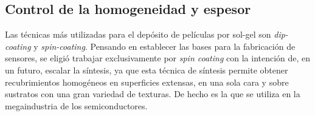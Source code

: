 	\subsection{Control de la homogeneidad y espesor}
		
		Las técnicas más utilizadas para el depósito de películas por sol-gel son \textit{dip-coating} y \textit{spin-coating}. 
		Pensando en establecer las bases para la fabricación de sensores, se eligió trabajar exclusivamente por \textit{spin coating} con la intención de, en un futuro, escalar la síntesis, ya que esta técnica de síntesis permite obtener recubrimientos homogéneos en superficies extensas, en una sola cara y sobre sustratos con una gran variedad de texturas. De hecho es la que se utiliza en la megaindustria de los semiconductores.\cite{Franssila2004,Jaeger2001} 

		

